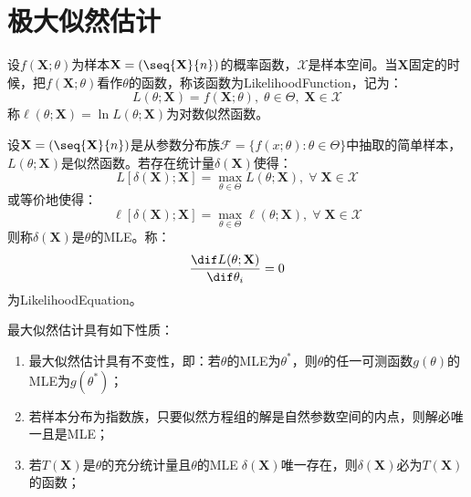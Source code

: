 \section{极大似然估计}

\begin{definition}
	设$f(\mathbf{X};\theta)$为样本$\mathbf{X}=(\seq{\mathbf{X}}{n})$的概率函数，$\mathcal{X}$是样本空间。当$\mathbf{X}$固定的时候，把$f(\mathbf{X};\theta)$看作$\theta$的函数，称该函数为\gls{LikelihoodFunction}，记为：
	\begin{equation*}
		L(\theta;\mathbf{X})=f(\mathbf{X};\theta),\;\theta\in\Theta,\;\mathbf{X}\in\mathcal{X}
	\end{equation*}
	称$\ell(\theta;\mathbf{X})=\ln L(\theta;\mathbf{X})$为对数似然函数。
\end{definition}
\begin{definition}
	设$\mathbf{X}=(\seq{\mathbf{X}}{n})$是从参数分布族$\mathcal{F}=\{f(x;\theta):\theta\in\Theta\}$中抽取的简单样本，$L(\theta;\mathbf{X})$是似然函数。若存在统计量$\delta(\mathbf{X})$使得：
	\begin{equation*}
		L[\delta(\mathbf{X});\mathbf{X}]=\max_{\theta\in\Theta}L(\theta;\mathbf{X}),\;\forall\;\mathbf{X}\in\mathcal{X}
	\end{equation*}
	或等价地使得：
	\begin{equation*}
		\ell[\delta(\mathbf{X});\mathbf{X}]=\max_{\theta\in\Theta}\ell(\theta;\mathbf{X}),\;\forall\;\mathbf{X}\in\mathcal{X}
	\end{equation*}
	则称$\delta(\mathbf{X})$是$\theta$的\gls{MLE}。称：
	\begin{equation*}
		\frac{\dif L(\theta;\mathbf{X})}{\dif\theta_i}=0
	\end{equation*}
	为\gls{LikelihoodEquation}。
\end{definition}
\begin{property}\label{prop:MLE}
	最大似然估计具有如下性质：
	\begin{enumerate}
		\item 最大似然估计具有不变性，即：若$\theta$的MLE为$\theta^*$，则$\theta$的任一可测函数$g(\theta)$的MLE为$g(\theta^*)$；
		\item 若样本分布为指数族，只要似然方程组的解是自然参数空间的内点，则解必唯一且是MLE；
		\item 若$T(\mathbf{X})$是$\theta$的充分统计量且$\theta$的MLE$\;\delta(\mathbf{X})$唯一存在，则$\delta(\mathbf{X})$必为$T(\mathbf{X})$的函数；
	\end{enumerate}
\end{property}